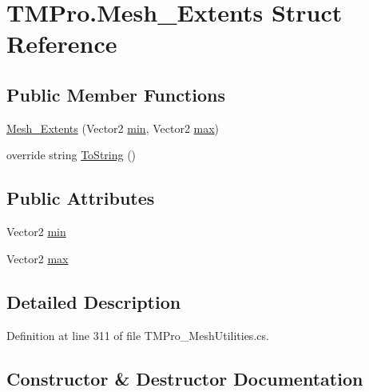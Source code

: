 \hypertarget{struct_t_m_pro_1_1_mesh___extents}{}\section{T\+M\+Pro.\+Mesh\+\_\+\+Extents Struct Reference}
\label{struct_t_m_pro_1_1_mesh___extents}
\subsection*{Public Member Functions}
\begin{DoxyCompactItemize}
\item 
\mbox{\hyperlink{struct_t_m_pro_1_1_mesh___extents_a47bd63cf8f9d32e3739e0c986b08300b}{Mesh\+\_\+\+Extents}} (Vector2 \mbox{\hyperlink{struct_t_m_pro_1_1_mesh___extents_ad03e74e2e5661735bd825a31feae5c95}{min}}, Vector2 \mbox{\hyperlink{struct_t_m_pro_1_1_mesh___extents_a5607321d47ef5cc849062aa196dfc10e}{max}})
\item 
override string \mbox{\hyperlink{struct_t_m_pro_1_1_mesh___extents_ae2f5e6bc1c18cc8bb0bde6b68636c8c0}{To\+String}} ()
\end{DoxyCompactItemize}
\subsection*{Public Attributes}
\begin{DoxyCompactItemize}
\item 
Vector2 \mbox{\hyperlink{struct_t_m_pro_1_1_mesh___extents_ad03e74e2e5661735bd825a31feae5c95}{min}}
\item 
Vector2 \mbox{\hyperlink{struct_t_m_pro_1_1_mesh___extents_a5607321d47ef5cc849062aa196dfc10e}{max}}
\end{DoxyCompactItemize}


\subsection{Detailed Description}


Definition at line 311 of file T\+M\+Pro\+\_\+\+Mesh\+Utilities.\+cs.



\subsection{Constructor \& Destructor Documentation}
\mbox{\label{struct_t_m_pro_1_1_mesh___extents_a47bd63cf8f9d32e3739e0c986b08300b}} 
